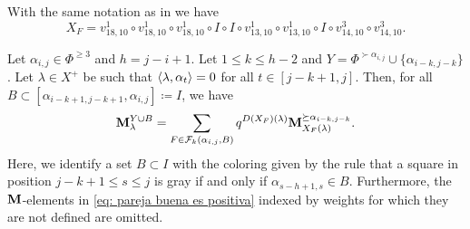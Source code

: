 \begin{example}\rm
    With the same notation as in  we have
    \begin{equation}
        X_F =    v_{18,10}^1 \circ  v_{18,10}^1 \circ v_{18,10}^1 \circ I\circ I\circ v_{13,10}^1\circ  v_{13,10}^1 \circ I\circ v_{14,10}^3 \circ v_{14,10}^3 . 
    \end{equation}
\end{example}



\begin{lemma}\rm\label{lem: pre - positivo caso bueno}
    Let  $\alpha_{i,j}\in \Phi^{\geq 3}$ and $h=j-i+1$. 
    Let $1\leq k \leq h-2$ and $Y = \Phi^{\succ \alpha_{i,j}}\cup \{ \alpha_{i-k,j-k}  \}$.
    Let $\lambda \in X^+$ be such that $\langle \lambda  , \alpha_{t} \rangle=0$ for all $t\in [j-k+1,j]$. 
    Then, for all  $B\subset [\alpha_{i-k+1,j-k+1},\alpha_{i,j}]\coloneqq I$, we have
    \begin{equation} \label{eq: pareja buena es positiva}
        \mathbf{M}_{\lambda}^{Y\cup B}= \sum_{F\in \mathcal{F}_k(\alpha_{i,j},B)} q^{D(X_F)(\lambda)} \mathbf{M}_{X_F(\lambda)}^{\succeq \alpha_{i-k,j-k}}. 
    \end{equation}
    Here, we identify a set $B\subset I$ with the coloring given by the rule that a square in position $j-k+1 \leq s \leq j$ is gray if and only if $\alpha_{s-h+1,s} \in B$.  
    Furthermore, the $\mathbf{M}$-elements in \eqref{eq: pareja buena es positiva} indexed by weights for which they are not defined are omitted. 
\end{lemma}

